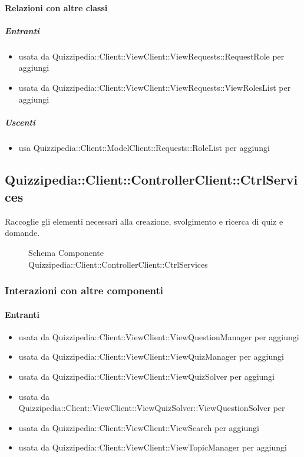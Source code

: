 \paragraph{Relazioni con altre classi}
\subparagraph{Entranti}
\begin{itemize}
\item usata da Quizzipedia::Client::ViewClient::ViewRequests::RequestRole per aggiungi
\item usata da Quizzipedia::Client::ViewClient::ViewRequests::ViewRolesList per aggiungi
\end{itemize}
\subparagraph{Uscenti}
\begin{itemize}
\item usa Quizzipedia::Client::ModelClient::Requests::RoleList per aggiungi
\end{itemize}
\subsection{Quizzipedia::Client::ControllerClient::CtrlServices}
Raccoglie gli elementi necessari alla creazione, svolgimento e ricerca di quiz e domande.
\begin{figure}[H]
\centering
\noindent{}
\caption[Schema Componente Quizzipedia::Client::ControllerClient::CtrlServices]{Schema Componente Quizzipedia::Client::ControllerClient::CtrlServices}
\end{figure}
\subsubsection{Interazioni con altre componenti}
\paragraph{Entranti}
\begin{itemize}
\item usata da Quizzipedia::Client::ViewClient::ViewQuestionManager per aggiungi
\item usata da Quizzipedia::Client::ViewClient::ViewQuizManager per aggiungi
\item usata da Quizzipedia::Client::ViewClient::ViewQuizSolver per aggiungi
\item usata da Quizzipedia::Client::ViewClient::ViewQuizSolver::ViewQuestionSolver per 
\item usata da Quizzipedia::Client::ViewClient::ViewSearch per aggiungi
\item usata da Quizzipedia::Client::ViewClient::ViewTopicManager per aggiungi
\end{itemize}
